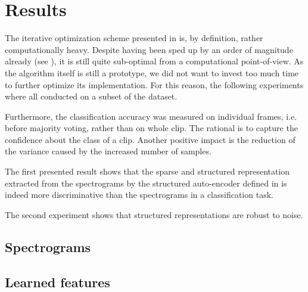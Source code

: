

\chapter{Results} \label{chap:results}

The iterative optimization scheme presented in  is, by definition, rather computationally heavy. Despite having been sped up by an order of magnitude already (see ), it is still quite sub-optimal from a computational point-of-view. As the algorithm itself is still a prototype, we did not want to invest too much time to further optimize its implementation. For this reason, the following experiments where all conducted on a subset of the dataset.

Furthermore, the classification accuracy was measured on individual frames, i.e. before majority voting, rather than on whole clip. The rational is to capture the confidence about the class of a clip. Another positive impact is the reduction of the variance caused by the increased number of samples.

The first presented result shows that the sparse and structured representation extracted from the spectrograms by the structured auto-encoder defined in  is indeed more discriminative than the spectrograms in a classification task.

The second experiment shows that structured representations are robust to noise.

\section{Spectrograms}

\section{Learned features}

